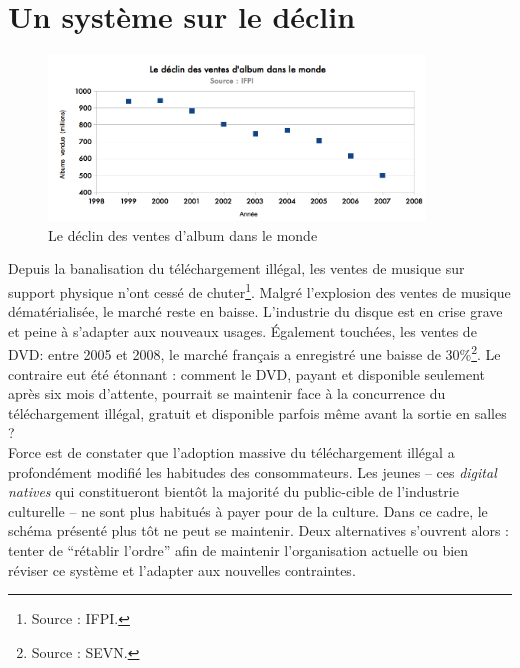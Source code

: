 \documentclass[a4paper]{report}
\begin{document}
	\section{Un système sur le déclin}
	\label{declin-systeme}

	\begin{figure}[ht]
		\begin{center}
			\includegraphics[width=10cm]{images/ventes-albums.png}
			\caption{Le déclin des ventes d'album dans le monde}
		\end{center}
	\end{figure}

	Depuis la banalisation du téléchargement illégal, les ventes de musique sur support physique n'ont cessé de chuter\footnote{Source : IFPI.}. Malgré l'explosion des ventes de musique dématérialisée, le marché reste en baisse. L'industrie du disque est en crise grave et peine à s'adapter aux nouveaux usages. 
	Également touchées, les ventes de DVD: entre 2005 et 2008, le marché français a enregistré une baisse de 30\%\footnote{Source : SEVN.}. Le contraire eut été étonnant : comment le DVD, payant et disponible seulement après six mois d'attente, pourrait se maintenir face à la concurrence du téléchargement illégal, gratuit et disponible parfois même avant la sortie en salles ?\\

	Force est de constater que l'adoption massive du téléchargement illégal a profondément modifié les habitudes des consommateurs. Les jeunes – ces \emph{digital natives} qui constitueront bientôt la majorité du public-cible de l'industrie culturelle – ne sont plus habitués à payer pour de la culture. Dans ce cadre, le schéma présenté plus tôt ne peut se maintenir. Deux alternatives s'ouvrent alors : tenter de ``rétablir l'ordre'' afin de maintenir l'organisation actuelle ou bien réviser ce système et l'adapter aux nouvelles contraintes.

\end{document}
